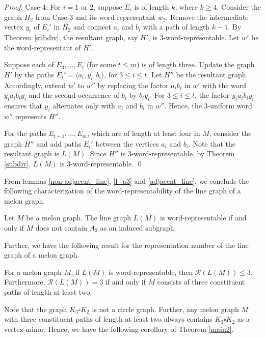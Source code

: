 \documentclass{llncs}
\begin{document}
\begin{proof}
	Case-4: For $i = 1$ or $2$, suppose $E_i$ is of length $k$, where $k \ge 4$. Consider the graph $H_2$ from Case-3 and its word-representant $w_2$. Remove the intermediate vertex $y_i$ of $E_i'$ in $H_2$ and connect $a_i$ and $b_i$ with a path of length $k-1$. By Theorem \ref{subdiv}, the resultant graph, say $H'$, is 3-word-representable. Let $w'$ be the word-representant of $H'$. 
	
	Suppose each of $E_3, \ldots, E_t$ (for some $t \le m$) is of length three. Update the graph $H'$ by the paths $E_i' = \langle a_i,y_i, b_i \rangle$, for $3 \le i \le t$. Let $H''$ be the resultant graph. Accordingly, extend $w'$ to $w''$ by replacing the factor $a_ib_i$ in $w'$ with the word $y_i a_i b_i y_i$ and the second occurrence of $b_i$ by $b_i y_i$.  For $3 \le i \le t$, the factor $y_i a_i b_i y_i$ ensures that $y_i$ alternates only with $a_i$ and $b_i$ in $w''$. Hence, the 3-uniform word $w''$ represents $H''$.
	
	For the paths $E_{t+1}, \ldots, E_m$, which are of length at least four in $M$, consider the graph $H''$ and add paths $E_i'$ between the vertices $a_i$ and $b_i$. Note that the resultant graph is $L(M)$. Since $H''$ is 3-word-representable, by Theorem \ref{subdiv}, $L(M)$ is 3-word-representable.	\qed	 
\end{proof}

From lemmas \ref{non-adjacent_line}, \ref{l_a3} and \ref{adjacent_line}, we conclude the following characterization of the word-representability of the line graph of a melon graph. 

\begin{theorem}\label{main1}
	Let $M$ be a melon graph. The line graph $L(M)$ is word-representable if and only if $M$ does not contain $A_3$ as an induced subgraph.
\end{theorem}

Further, we have the following result for the representation number of the line graph of a melon graph.

\begin{theorem}\label{main2}
	For a melon graph $M$, if $L(M)$ is word-representable, then $\mathcal{R}(L(M)) \le 3$. Furthermore, $\mathcal{R}(L(M)) = 3$ if and only if $M$ consists of three constituent paths of length at least two. 
\end{theorem}

Note that the graph $K_3 \square K_2$ is not a circle graph. Further, any melon graph $M$ with three constituent paths of length at least two always contains $K_3 \square K_2$ as a vertex-minor. Hence, we have the following corollary of Theorem \ref{main2}.
\end{document}
